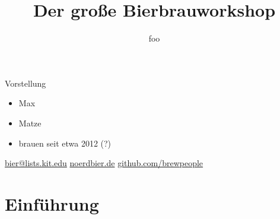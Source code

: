 \documentclass[18pt]{beamer}
\title{Der große Bierbrauworkshop}
\author{foo}
\begin{document}
\maketitle



\begin{frame}{Vorstellung}
  \begin{itemize}
    \item Max
    \item Matze
    \item brauen seit etwa 2012 (?)
  \end{itemize}
  \url{bier@lists.kit.edu}
  \url{noerdbier.de}
  \url{github.com/brewpeople}
\end{frame}

\section{Einführung}
\end{document}
